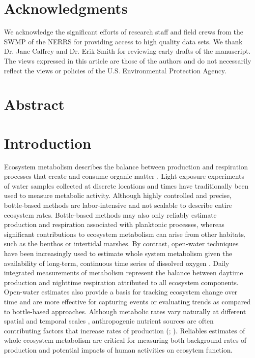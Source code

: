 \documentclass[letterpaper,12pt,oneside]{article}\usepackage[]{graphicx}\usepackage[]{color}
\begin{document}
\raggedbottom
\linenumbers
\raggedright
{}
\setlength{\parindent}{0.5in}
\renewcommand\refname{References \vspace{12pt}}



\section{Acknowledgments}

We acknowledge the significant efforts of research staff and field crews from the \acl{SWMP} of the \acl{NERRS} for providing access to high quality data sets.  We thank Dr. Jane Caffrey and Dr. Erik Smith for reviewing early drafts of the manuscript. The views expressed in this article are those of the authors and do not necessarily reflect the views or policies of the U.S. Environmental Protection Agency.

\newpage
\section{Abstract}


\acresetall
\clearpage

\section{Introduction} \label{intro}

Ecosystem metabolism describes the balance between production and respiration processes that create and consume organic matter \citep{Kemp12,Needoba12}.  Light exposure experiments of water samples collected at discrete locations and times have traditionally been used to measure metabolic activity.  Although highly controlled and precise, bottle-based methods are labor-intensive and not scalable to describe entire ecosystem rates.  Bottle-based methods may also only reliably estimate production and respiration associated with planktonic processes, whereas significant contributions to ecosystem metabolism can arise from other habitats, such as the benthos or intertidal marshes.  By contrast, open-water techniques have been increasingly used to estimate whole system metabolism given the availability of long-term, continuous time series of dissolved oxygen \citep{Odum56,Davanzo96}. Daily integrated measurements of metabolism represent the balance between daytime production and nighttime respiration attributed to all ecosystem components.  Open-water estimates also provide a basis for tracking ecosystem change over time and are more effective for capturing events or evaluating trends as compared to bottle-based approaches. Although metabolic rates vary naturally at different spatial and temporal scales \citep{Ziegler98,Caffrey04,Russell07}, anthropogenic nutrient sources are often contributing factors that increase rates of production (\citealt{Nixon95}; ).  Reliables estimates of whole ecosystem metabolism are critical for measuring both background rates of production and potential impacts of human activities on ecosytem function.     
\end{document}
